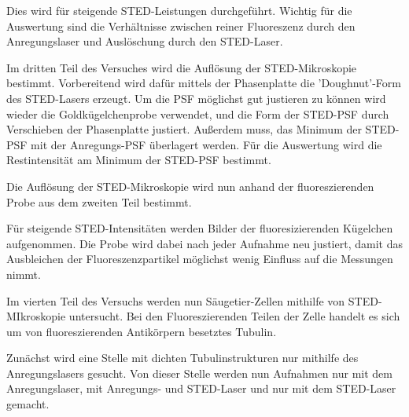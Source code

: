 Dies wird für steigende STED-Leistungen durchgeführt. Wichtig für die Auswertung sind die Verhältnisse zwischen reiner Fluoreszenz durch den Anregungslaser und Auslöschung durch den STED-Laser.

Im dritten Teil des Versuches wird die Auflösung der STED-Mikroskopie bestimmt.
Vorbereitend wird dafür mittels der Phasenplatte die 'Doughnut'-Form des STED-Lasers erzeugt. 
Um die PSF möglichst gut justieren zu können wird wieder die Goldkügelchenprobe verwendet, und die Form der STED-PSF durch Verschieben der Phasenplatte justiert.
Außerdem muss, das Minimum der STED-PSF mit der Anregungs-PSF überlagert werden.
Für die Auswertung wird die Restintensität am Minimum der STED-PSF bestimmt.

Die Auflösung der STED-Mikroskopie wird nun anhand der fluoreszierenden Probe aus dem zweiten Teil bestimmt.

Für steigende STED-Intensitäten werden Bilder der fluoresizierenden Kügelchen aufgenommen. 
Die Probe wird dabei nach jeder Aufnahme neu justiert, damit das Ausbleichen der Fluoreszenzpartikel möglichst wenig Einfluss auf die Messungen nimmt.

Im vierten Teil des Versuchs werden nun Säugetier-Zellen mithilfe von STED-MIkroskopie untersucht.
Bei den Fluoreszierenden Teilen der Zelle handelt es sich um von fluoreszierenden Antikörpern besetztes Tubulin.

Zunächst wird eine Stelle mit dichten Tubulinstrukturen nur mithilfe des Anregungslasers gesucht.
Von dieser Stelle werden nun Aufnahmen nur mit dem Anregungslaser, mit Anregungs- und STED-Laser und nur mit dem STED-Laser gemacht.




